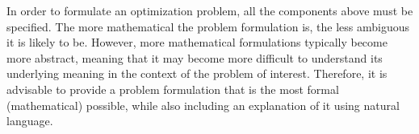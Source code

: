 In order to formulate an optimization problem, all the components above must be specified. The more mathematical the problem formulation is, the less ambiguous it is likely to be. However, more mathematical formulations typically become more abstract, meaning that it may become more difficult to understand its underlying meaning in the context of the problem of interest. Therefore, it is advisable to provide a problem formulation that is the most formal (mathematical) possible, while also including an explanation of it using natural language. %

%
%
%
%
